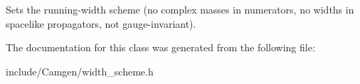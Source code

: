 Sets the running-\/width scheme (no complex masses in numerators, no widths in spacelike propagators, not gauge-\/invariant). 



The documentation for this class was generated from the following file\+:\begin{DoxyCompactItemize}
\item 
include/\+Camgen/width\+\_\+scheme.\+h\end{DoxyCompactItemize}
